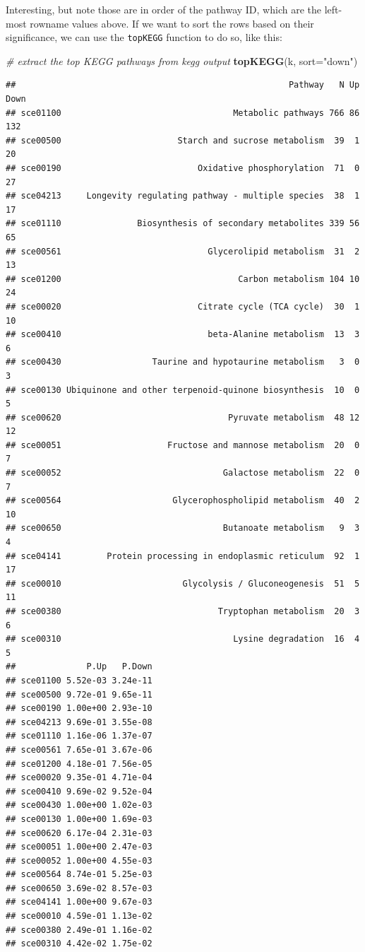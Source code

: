 \documentclass[
]{book}
\newenvironment{Shaded}{\begin{snugshade}}{\end{snugshade}}
\newcommand{\AttributeTok}[1]{\textcolor[rgb]{0.13,0.29,0.53}{#1}}
\newcommand{\CommentTok}[1]{\textcolor[rgb]{0.56,0.35,0.01}{\textit{#1}}}
\newcommand{\FunctionTok}[1]{\textcolor[rgb]{0.13,0.29,0.53}{\textbf{#1}}}
\newcommand{\NormalTok}[1]{#1}
\newcommand{\StringTok}[1]{\textcolor[rgb]{0.31,0.60,0.02}{#1}}
\begin{document}
Interesting, but note those are in order of the pathway ID, which are the left-most rowname values above.
If we want to sort the rows based on their significance, we can use the \texttt{topKEGG} function to do so, like this:

\begin{Shaded}
\begin{Highlighting}[]
\CommentTok{\# extract the top KEGG pathways from kegg output}
\FunctionTok{topKEGG}\NormalTok{(k, }\AttributeTok{sort=}\StringTok{"down"}\NormalTok{)}
\end{Highlighting}
\end{Shaded}

\begin{verbatim}
##                                                      Pathway   N Up Down
## sce01100                                  Metabolic pathways 766 86  132
## sce00500                       Starch and sucrose metabolism  39  1   20
## sce00190                           Oxidative phosphorylation  71  0   27
## sce04213     Longevity regulating pathway - multiple species  38  1   17
## sce01110               Biosynthesis of secondary metabolites 339 56   65
## sce00561                             Glycerolipid metabolism  31  2   13
## sce01200                                   Carbon metabolism 104 10   24
## sce00020                           Citrate cycle (TCA cycle)  30  1   10
## sce00410                             beta-Alanine metabolism  13  3    6
## sce00430                  Taurine and hypotaurine metabolism   3  0    3
## sce00130 Ubiquinone and other terpenoid-quinone biosynthesis  10  0    5
## sce00620                                 Pyruvate metabolism  48 12   12
## sce00051                     Fructose and mannose metabolism  20  0    7
## sce00052                                Galactose metabolism  22  0    7
## sce00564                      Glycerophospholipid metabolism  40  2   10
## sce00650                                Butanoate metabolism   9  3    4
## sce04141         Protein processing in endoplasmic reticulum  92  1   17
## sce00010                        Glycolysis / Gluconeogenesis  51  5   11
## sce00380                               Tryptophan metabolism  20  3    6
## sce00310                                  Lysine degradation  16  4    5
##              P.Up   P.Down
## sce01100 5.52e-03 3.24e-11
## sce00500 9.72e-01 9.65e-11
## sce00190 1.00e+00 2.93e-10
## sce04213 9.69e-01 3.55e-08
## sce01110 1.16e-06 1.37e-07
## sce00561 7.65e-01 3.67e-06
## sce01200 4.18e-01 7.56e-05
## sce00020 9.35e-01 4.71e-04
## sce00410 9.69e-02 9.52e-04
## sce00430 1.00e+00 1.02e-03
## sce00130 1.00e+00 1.69e-03
## sce00620 6.17e-04 2.31e-03
## sce00051 1.00e+00 2.47e-03
## sce00052 1.00e+00 4.55e-03
## sce00564 8.74e-01 5.25e-03
## sce00650 3.69e-02 8.57e-03
## sce04141 1.00e+00 9.67e-03
## sce00010 4.59e-01 1.13e-02
## sce00380 2.49e-01 1.16e-02
## sce00310 4.42e-02 1.75e-02
\end{verbatim}
\end{document}
